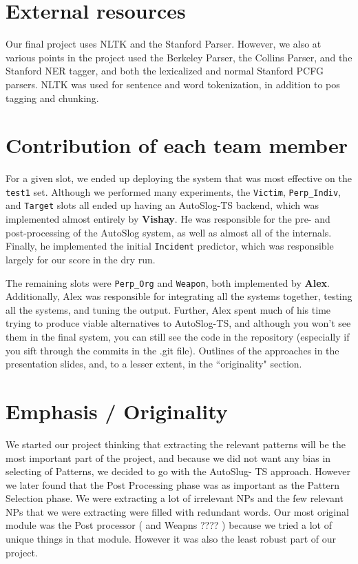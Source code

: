 \documentclass[11pt]{myclass}
\begin{document}
\section{External resources}

Our final project uses NLTK and the Stanford Parser. However, we also at various points in the project used the Berkeley Parser, the Collins Parser, and the Stanford NER tagger, and both the lexicalized and normal Stanford PCFG parsers. NLTK was used for sentence and word tokenization, in addition to pos tagging and chunking.

\section{Contribution of each team member}

For a given slot, we ended up deploying the system that was most effective on the \texttt{test1} set. Although we performed many experiments, the \texttt{Victim}, \texttt{Perp\_Indiv}, and \texttt{Target} slots all ended up having an AutoSlog-TS backend, which was implemented almost entirely by \textbf{Vishay}. He was responsible for the pre- and post-processing of the AutoSlog system, as well as almost all of the internals. Finally, he implemented the initial \texttt{Incident} predictor, which was responsible largely for our score in the dry run.

The remaining slots were \texttt{Perp\_Org} and \texttt{Weapon}, both implemented by \textbf{Alex}. Additionally, Alex was responsible for integrating all the systems together, testing all the systems, and tuning the output. Further, Alex spent much of his time trying to produce viable alternatives to AutoSlog-TS, and although you won't see them in the final system, you can still see the code in the repository (especially if you sift through the commits in the .git file). Outlines of the approaches in the presentation slides, and, to a lesser extent, in the ``originality" section.

\section{Emphasis / Originality}

We started our project thinking that extracting the relevant patterns will be the most important part of the project, and because we did not want any bias in selecting of Patterns, we decided to go with the AutoSlug- TS approach. However we later found that the Post Processing phase was as important as the Pattern Selection phase. We were extracting a lot of irrelevant NPs and the few relevant NPs that we were extracting were filled with redundant words. Our most original module was the Post processor ( and Weapns ???? ) because we tried a lot of unique things in that module. However it was also the least robust part of our project.
\end{document}
